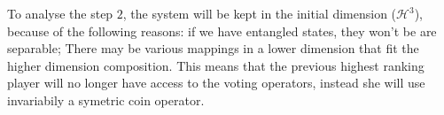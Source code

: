 To analyse the step $2$,  the system will be kept in the initial dimension ($\mathcal{H}^{3}$), because of the following reasons: if we have entangled states, they won't be are separable; There may be various mappings in a lower dimension that fit the higher dimension composition. This means that the previous highest ranking player will no longer have access to the voting operators, instead she will use invariabily a symetric coin operator.


\begin{comment}

''''''Depending on the measurement outcome that occurs with probability x, the players will act on the second round. The Luders rule is applied here. The highest ranking player will no longer have access to the voting operators, instead he will only be able to manipulate de system using a symetric coin operator.

Keeping the system in a higher dimension is considered because of the following reasons: if we have entangled states, they won't be are separable, and there are various mappings to a lower dimension that fit the system composition. 


\begin{emph}
One important aspect is that the payoff functional changes

Initial state: variable to study.
Payoff functions: variable to study.
\end{emph}

\end{comment}